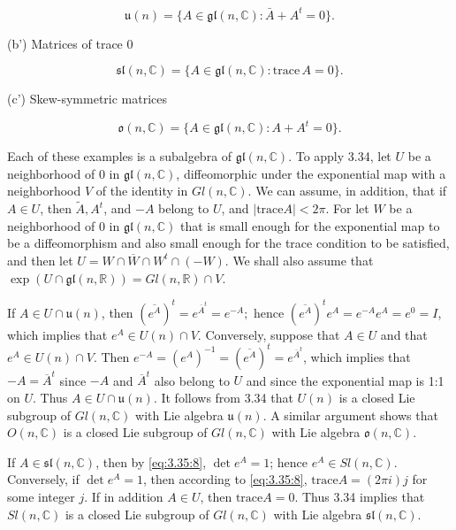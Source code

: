 \[
\mathfrak{u}(n)=\{A\in\mathfrak{gl}(n,\mathbb{C})\colon\bar{A}+A^{t}=0\}.
\]

(b') Matrices of trace 0 

\[
\mathfrak{sl}(n,\mathbb{C})=\{A\in\mathfrak{gl}(n,\mathbb{C})\colon\mathrm{trace}\,A=0\}.
\]

(c') Skew-symmetric matrices 

\[
\mathfrak{o}(n,\mathbb{C})=\{A\in\mathfrak{gl}(n,\mathbb{C})\colon A+A^{t}=0\}.
\]

Each of these examples is a subalgebra of $\mathfrak{gl}(n,\mathbb{C})$. To apply 3.34, let $U$ be a neighborhood of $0$ in $\mathfrak{gl}(n,\mathbb{C})$, diffeomorphic under the exponential map with a neighborhood $V$ of the identity in $Gl(n,\mathbb{C})$. We can assume, in addition, that if $A\in U$, then $\widetilde{A}, A^t$, and $-A$ belong to $U$, and $|\mathrm{trace}A|<2\pi$. For let $W$ be a neighborhood of $0$ in $\mathfrak{gl}(n,\mathbb{C})$ that is small enough for the exponential map to be a diffeomorphism and also small enough for the trace condition to be satisfied, and then let $U=W\cap\overline{W}\cap W^t\cap(-W)$. We shall also assume that $\exp(U\cap\mathfrak{gl}(n,\mathbb{R}))=Gl(n,\mathbb{R})\cap V$.

If $A \in U \cap \mathfrak{u}(n)$, then $(\overline{e^A})^t = e^{\overline{A}^t} = e^{-A};$ hence $(\overline{e^A})^t e^A = e^{-A} e^A = e^0 = I$, which implies that $e^A \in U(n) \cap V$. Conversely, suppose that $A \in U$ and that $e^A \in U(n) \cap V$. Then $e^{-A} = (e^A)^{-1} = (\overline{e^A})^t = e^{\overline{A}^t}$, which implies that $-A = \overline{A}^t$ since $-A$ and $\overline{A}^t$ also belong to $U$ and since the exponential map is 1:1 on $U$. Thus $A \in U \cap \mathfrak{u}(n)$. It follows from 3.34 that $U(n)$ is a closed Lie subgroup of $Gl(n, \mathbb{C})$ with Lie algebra $\mathfrak{u}(n)$. A similar argument shows that $O(n, \mathbb{C})$ is a closed Lie subgroup of $Gl(n, \mathbb{C})$ with Lie algebra $\mathfrak{o}(n, \mathbb{C})$.

If $A \in \mathfrak{sl}(n,\mathbb{C})$, then by \eqref{eq:3.35:8}, $\det e^A = 1$; hence $e^A \in Sl(n,\mathbb{C})$. Conversely, if $\det e^A = 1$, then according to \eqref{eq:3.35:8}, $\mathrm{trace} A = (2\pi i)j$ for some integer $j$. If in addition $A \in U$, then $\mathrm{trace} A = 0$. Thus 3.34 implies that $Sl(n,\mathbb{C})$ is a closed Lie subgroup of $Gl(n,\mathbb{C})$ with Lie algebra $\mathfrak{sl}(n,\mathbb{C})$.


